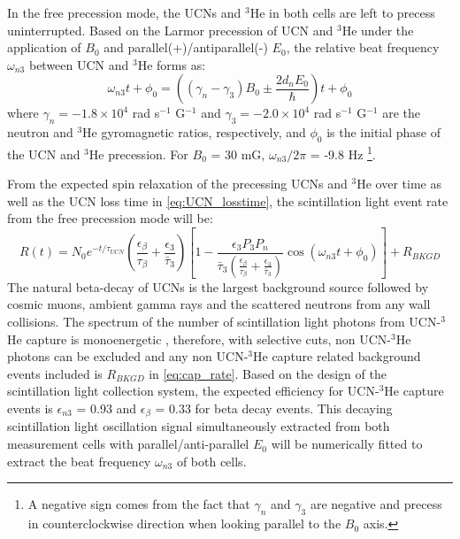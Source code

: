 In the free precession mode, the UCNs and $^3$He in both cells are left to precess uninterrupted. Based on the Larmor precession of UCN and $^3$He under the application of $B_0$ and parallel(+)/antiparallel(-) $E_0$, the relative beat frequency $\omega_{n3}$ between UCN and $^3$He forms as: 
\begin{equation}
    \omega_{n3}t + \phi_0 = \left( \left(\gamma_n - \gamma_3 \right) B_0 \pm \frac{2d_nE_0}{\hbar} \right) t + \phi_0
    \label{eq:fp_pres}
\end{equation}
where $\gamma_n = -1.8 \times 10^4$ rad s$^{-1}$ G$^{-1}$ \cite{Codata2021} and $\gamma_3 = -2.0 \times 10^4$ rad s$^{-1}$ G$^{-1}$ \cite{Codata2021} are the neutron and $^3$He gyromagnetic ratios, respectively, and $\phi_0$ is the initial phase of the UCN and $^3$He precession. For $B_0$ = 30 mG, $\omega_{n3}/2\pi$ = -9.8 Hz \footnote{A negative sign comes from the fact that $\gamma_n$ and $\gamma_3$ are negative and precess in counterclockwise direction when looking parallel to the $B_0$ axis.}. 


From the expected spin relaxation of the precessing UCNs and $^3$He over time as well as the UCN loss time in \cref{eq:UCN_losstime}, the scintillation light event rate from the free precession mode will be: 
\begin{equation}
 R(t) = N_0 e^{-t/\tau_{UCN}} \left (\frac{\epsilon_\beta}{\tau_\beta}+\frac{\epsilon_3}{\bar{\tau}_3}\right ) \left [1- \frac{\epsilon_3
P_3P_n}{\bar{\tau}_3\left (\frac{\epsilon_\beta}{\tau_\beta}+\frac{\epsilon_3}{\bar{\tau}_3}\right )} \cos{(\omega_{n3} t+\phi_0 )}
\right ]+ R_{BKGD}
\label{eq:FP_rate}
\end{equation}
The natural beta-decay of UCNs is the largest background source followed by cosmic muons, ambient gamma rays and the scattered neutrons from any wall collisions. The spectrum of the number of scintillation light photons from UCN-$^3$He capture is monoenergetic \cite{Ito2012, Ito2013}, therefore, with selective cuts, non UCN-$^3$He photons can be excluded and any non UCN-$^3$He capture related background events included is $R_{BKGD}$ in \cref{eq:cap_rate}. Based on the design of the scintillation light collection system, the expected efficiency for UCN-$^3$He capture events is $\epsilon_{n3}$ = 0.93 and $\epsilon_{\beta}$ = 0.33 for beta decay events. This decaying scintillation light oscillation signal simultaneously extracted from both measurement cells with parallel/anti-parallel $E_0$ will be numerically fitted to extract the beat frequency $\omega_{n3}$ of both cells.

